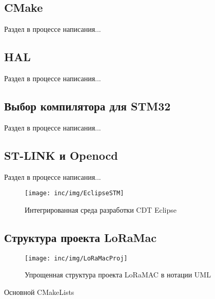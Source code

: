 
\subsection{CMake}

Раздел в процессе написания...

\subsection{HAL}

Раздел в процессе написания...

\subsection{Выбор компилятора для STM32}

Раздел в процессе написания...

\subsection{ST-LINK и Openocd}

Раздел в процессе написания...

\begin{figure}[!h]
  \centering
  \texttt{[image: inc/img/EclipseSTM]}
  \caption{Интегрированная среда разработки CDT Eclipse}
  \label{fig:ideeclipse}
\end{figure}


\begin{listing}[H]
 
\end{listing}
\label{lst:boardinit}

\subsection{Структура проекта LoRaMac}
\begin{figure}[!h]
  \centering
  \texttt{[image: inc/img/LoRaMacProj]}
  \caption{Упрощенная структура проекта LoRaMAC в нотации UML}
  \label{fig:loramacstructure}
\end{figure}

\begin{listing}[H]
\caption{Основной CMakeLists} 
\end{listing}
\label{lst:maincmake}

